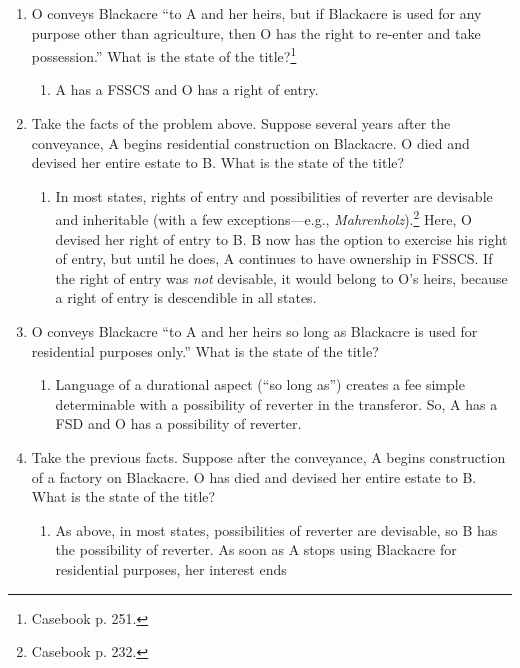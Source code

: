 \begin{enumerate}
    \item O conveys Blackacre ``to A and her heirs, but if Blackacre is used 
    for any purpose other than agriculture, then O has the right to re-enter 
    and take possession.'' What is the state of the title?\footnote{Casebook 
    p. 251.}
    \begin{enumerate}
        \item A has a FSSCS and O has a right of entry.
    \end{enumerate}
    \item Take the facts of the problem above. Suppose several years after the 
    conveyance, A begins residential construction on Blackacre. O died and 
    devised her entire estate to B. What is the state of the title?
    \begin{enumerate}
        \item In most states, rights of entry and possibilities of reverter 
        are devisable and inheritable (with a few exceptions---e.g., 
        \emph{Mahrenholz}).\footnote{Casebook p. 232.} Here, O devised her 
        right of entry to B. B now has the option to exercise his right of 
        entry, but until he does, A continues to have ownership in FSSCS. If 
        the right of entry was \emph{not} devisable, it would belong to O's 
        heirs, because a right of entry is descendible in all states. 
    \end{enumerate}
    \item O conveys Blackacre ``to A and her heirs so long as Blackacre is 
    used for residential purposes only.'' What is the state of the title?
    \begin{enumerate}
        \item Language of a durational aspect (``so long as'') creates a fee 
        simple determinable with a possibility of reverter in the transferor. 
        So, A has a FSD and O has a possibility of reverter.
    \end{enumerate}
    \item Take the previous facts. Suppose after the conveyance, A begins 
    construction of a factory on Blackacre. O has died and devised her entire 
    estate to B. What is the state of the title?
    \begin{enumerate}
        \item As above, in most states, possibilities of reverter are 
        devisable, so B has the possibility of reverter. As soon as A stops 
        using Blackacre for residential purposes, her interest ends 

\end{enumerate}
\end{enumerate}

